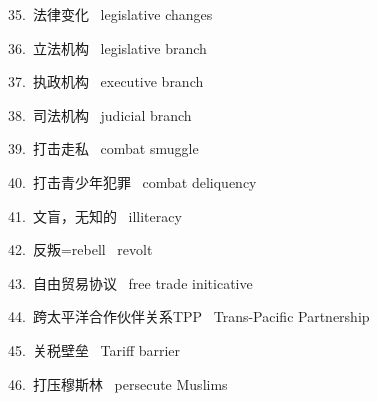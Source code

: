 \documentclass[a4paper, 12pt]{article}
\begin{document}
\begin{multicols}{2}
\begin{flushleft}
35.\ 法律变化 \ legislative changes
\end{flushleft}

\begin{flushleft}
36.\ 立法机构 \ legislative branch
\end{flushleft}
\end{multicols}

\begin{multicols}{2}
\begin{flushleft}
37.\ 执政机构 \ executive branch
\end{flushleft}

\begin{flushleft}
38.\ 司法机构 \ judicial branch
\end{flushleft}
\end{multicols}

\begin{multicols}{2}
\begin{flushleft}
39.\ 打击走私 \ combat smuggle
\end{flushleft}

\begin{flushleft}
40.\ 打击青少年犯罪 \ combat deliquency
\end{flushleft}
\end{multicols}

\begin{multicols}{2}
\begin{flushleft}
41.\ 文盲，无知的 \ illiteracy
\end{flushleft}

\begin{flushleft}
42.\ 反叛=rebell \ revolt
\end{flushleft}
\end{multicols}

\begin{multicols}{2}
\begin{flushleft}
43.\ 自由贸易协议 \ free trade initicative
\end{flushleft}

\begin{flushleft}
44.\ 跨太平洋合作伙伴关系TPP \ Trans-Pacific Partnership
\end{flushleft}
\end{multicols}

\begin{multicols}{2}
\begin{flushleft}
45.\ 关税壁垒 \ Tariff barrier
\end{flushleft}

\begin{flushleft}
46.\ 打压穆斯林 \ persecute Muslims
\end{flushleft}
\end{multicols}
\end{document}
